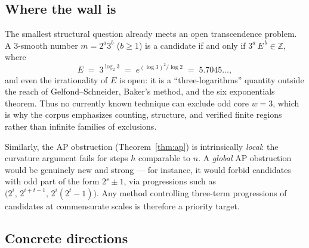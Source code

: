 \documentclass[11pt]{article}
\theoremstyle{definition}
\theoremstyle{remark}
\newcommand{\Z}{\mathbb{Z}}
\begin{document}
\subsection*{Where the wall is}

The smallest structural question already meets an open transcendence problem. A $3$-smooth
number $m=2^a 3^b$ ($b\ge1$) is a candidate if and only if
$3^a\,E^{\,b}\in\Z$, where
\[
E \;=\; 3^{\log_2 3}\;=\;e^{(\log 3)^2/\log 2}\;=\;5.7045\ldots,
\]
and even the irrationality of $E$ is open: it is a ``three-logarithms'' quantity outside the
reach of Gelfond--Schneider, Baker's method, and the six exponentials theorem. Thus no
currently known technique can exclude odd core $w=3$, which is why the corpus emphasizes
counting, structure, and verified finite regions rather than infinite families of
exclusions.

Similarly, the AP obstruction (Theorem~\ref{thm:ap}) is intrinsically \emph{local}: the
curvature argument fails for steps $h$ comparable to $n$. A \emph{global} AP obstruction
would be genuinely new and strong --- for instance, it would forbid candidates with odd part
of the form $2^s\pm 1$, via progressions such as $\bigl(2^i,\,2^{i+t-1},\,2^i(2^t-1)\bigr)$.
Any method controlling three-term progressions of candidates at commensurate scales is
therefore a priority target.

\subsection*{Concrete directions}
\end{document}
